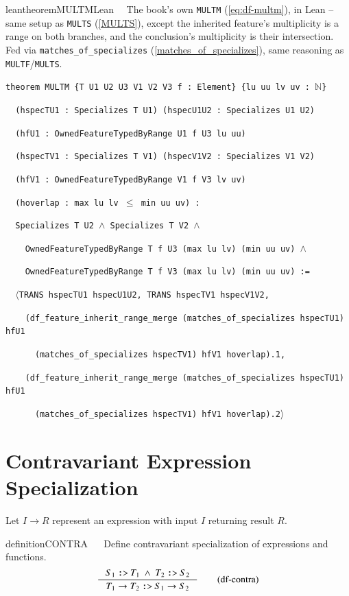 \begin{restatable}{leantheorem}{MULTMLean}~~ The book's own \texttt{MULTM}
(\ref{eq:df-multm}), in Lean -- same setup as \texttt{MULTS} (\ref{MULTS}), except the inherited
feature's multiplicity is a range on both branches, and the conclusion's multiplicity is their
intersection. Fed via \texttt{matches\_of\_specializes} (\ref{matches_of_specializes}), same reasoning
as \texttt{MULTF}/\texttt{MULTS}.

\texttt{\textcolor{leancolor}{theorem} \textcolor{leanyellow}{MULTM} \{T U1 U2 U3 V1 V2 V3 f : Element\} \{lu uu lv uv : $\mathbb{N}$\}}

\texttt{~~(hspecTU1 : Specializes T U1) (hspecU1U2 : Specializes U1 U2)}

\texttt{~~(hfU1 : OwnedFeatureTypedByRange U1 f U3 lu uu)}

\texttt{~~(hspecTV1 : Specializes T V1) (hspecV1V2 : Specializes V1 V2)}

\texttt{~~(hfV1 : OwnedFeatureTypedByRange V1 f V3 lv uv)}

\texttt{~~(hoverlap : max lu lv $\le$ min uu uv) :}

\texttt{~~Specializes T U2 $\wedge$ Specializes T V2 $\wedge$}

\texttt{~~~~OwnedFeatureTypedByRange T f U3 (max lu lv) (min uu uv) $\wedge$}

\texttt{~~~~OwnedFeatureTypedByRange T f V3 (max lu lv) (min uu uv) :=}

\texttt{~~$\langle$TRANS hspecTU1 hspecU1U2, TRANS hspecTV1 hspecV1V2,}

\texttt{~~~~(df\_feature\_inherit\_range\_merge (matches\_of\_specializes hspecTU1) hfU1}

\texttt{~~~~~~(matches\_of\_specializes hspecTV1) hfV1 hoverlap).1,}

\texttt{~~~~(df\_feature\_inherit\_range\_merge (matches\_of\_specializes hspecTU1) hfU1}

\texttt{~~~~~~(matches\_of\_specializes hspecTV1) hfV1 hoverlap).2$\rangle$}
\label{MULTM}
\end{restatable}

\section{Contravariant Expression Specialization}\label{sec:contra}

Let $I \rightarrow R$ represent an expression with input $I$ returning result $R$.
\begin{restatable}{definition}{CONTRA}~ ~
  Define contravariant specialization of expressions and functions.  
\begin{align}
\inference
{S_1~\texttt{:>}~T_1  ~\wedge~T_2~\texttt{:>}~S_2}
{T_1 \rightarrow T_2~\texttt{:>}~S_1 \rightarrow S_2}
\label{eq:df-contra}\tag{df-contra}
\end{align}
\end{restatable}

